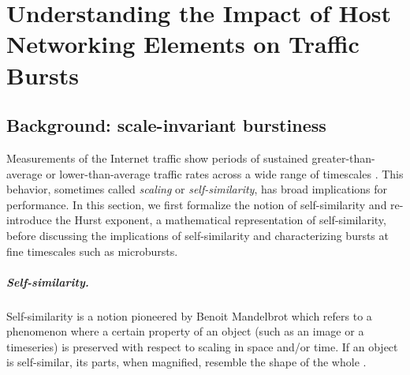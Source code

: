 \chapter{Understanding the Impact of Host Networking Elements on Traffic Bursts} \label{chap:chapter-2}




    
\section{Background: scale-invariant burstiness}
\label{sec:valinor-background}
Measurements of the Internet traffic show periods of sustained greater-than-average or lower-than-average traffic rates across a wide range of timescales \cite{wan,web,vbr,selfsim,filesize}. 
%
This behavior, sometimes called \emph{scaling} or \emph{self-similarity}, has broad implications for performance. In this section, we first formalize the notion of self-similarity and re-introduce the Hurst exponent, a mathematical representation of self-similarity, before discussing the implications of self-similarity and characterizing bursts at fine timescales such as microbursts.

\paragraph{Self-similarity.} 
Self-similarity is a notion pioneered by Benoit Mandelbrot \cite{mandelbrot} which refers to a phenomenon where a certain property of an object (such as an image or a timeseries) is preserved with respect to scaling in space and/or time. If an object is self-similar, its parts, when magnified, resemble the shape of the whole \cite{self_similar_overview}.

